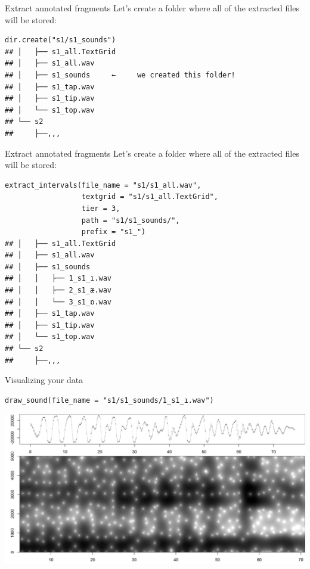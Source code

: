 \documentclass[13pt, t]{beamer}
\begin{document}
\begin{frame}[fragile]{Extract annotated fragments}
Let's create a folder where all of the extracted files will be stored:
\begin{verbatim}
dir.create("s1/s1_sounds")
## │   ├── s1_all.TextGrid
## │   ├── s1_all.wav
## │   ├── s1_sounds     ←     we created this folder!
## │   ├── s1_tap.wav
## │   ├── s1_tip.wav
## │   └── s1_top.wav
## └── s2
##     ├──,,,
\end{verbatim}
\end{frame}

\begin{frame}[fragile]{Extract annotated fragments}
Let's create a folder where all of the extracted files will be stored:
\begin{verbatim}
extract_intervals(file_name = "s1/s1_all.wav", 
                  textgrid = "s1/s1_all.TextGrid",
                  tier = 3,
                  path = "s1/s1_sounds/",
                  prefix = "s1_")
## │   ├── s1_all.TextGrid
## │   ├── s1_all.wav
## │   ├── s1_sounds
## │   │   ├── 1_s1_ı.wav
## │   │   ├── 2_s1_æ.wav
## │   │   └── 3_s1_ɒ.wav
## │   ├── s1_tap.wav
## │   ├── s1_tip.wav
## │   └── s1_top.wav
## └── s2
##     ├──,,,
\end{verbatim}
\end{frame}

\begin{frame}[fragile]{Visualizing your data}
\begin{verbatim}
draw_sound(file_name = "s1/s1_sounds/1_s1_ı.wav")
\end{verbatim}
\includegraphics[width=\linewidth]{images/07_draw_sound.png}
\end{frame}
\end{document}

